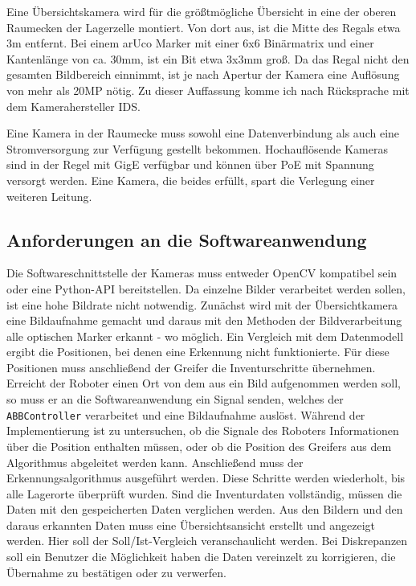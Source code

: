 Eine Übersichtskamera wird für die größtmögliche Übersicht in eine der oberen Raumecken der Lagerzelle montiert.
Von dort aus, ist die Mitte des Regals etwa 3m entfernt. 
Bei einem arUco Marker mit einer 6x6 Binärmatrix und einer Kantenlänge von ca. 30mm, ist ein Bit etwa 3x3mm groß.
Da das Regal nicht den gesamten Bildbereich einnimmt, ist je nach Apertur der Kamera eine Auflösung von mehr als 20MP nötig. 
Zu dieser Auffassung komme ich nach Rücksprache mit dem Kamerahersteller IDS. 

Eine Kamera in der Raumecke muss sowohl eine Datenverbindung als auch eine Stromversorgung zur Verfügung gestellt bekommen.
Hochauflösende Kameras sind in der Regel mit GigE verfügbar und können über PoE mit Spannung versorgt werden. 
Eine Kamera, die beides erfüllt, spart die Verlegung einer weiteren Leitung. 


\subsection{Anforderungen an die Softwareanwendung}

Die Softwareschnittstelle der Kameras muss entweder OpenCV kompatibel sein oder eine Python-API bereitstellen.
Da einzelne Bilder verarbeitet werden sollen, ist eine hohe Bildrate nicht notwendig.
Zunächst wird mit der Übersichtkamera eine Bildaufnahme gemacht und daraus mit den Methoden der Bildverarbeitung alle optischen Marker erkannt - wo möglich.
Ein Vergleich mit dem Datenmodell ergibt die Positionen, bei denen eine Erkennung nicht funktionierte.
Für diese Positionen muss anschließend der Greifer die Inventurschritte übernehmen.
Erreicht der Roboter einen Ort von dem aus ein Bild aufgenommen werden soll, so muss er an die Softwareanwendung ein Signal senden, welches
der \verb|ABBController| verarbeitet und eine Bildaufnahme auslöst.
Während der Implementierung ist zu untersuchen, ob die Signale des Roboters Informationen über die Position enthalten müssen, oder ob die Position des Greifers aus dem Algorithmus abgeleitet werden kann.
Anschließend muss der Erkennungsalgorithmus ausgeführt werden.
Diese Schritte werden wiederholt, bis alle Lagerorte überprüft wurden.  
Sind die Inventurdaten vollständig, müssen die Daten mit den gespeicherten Daten verglichen werden.
Aus den Bildern und den daraus erkannten Daten muss eine Übersichtsansicht erstellt und angezeigt werden. 
Hier soll der Soll/Ist-Vergleich veranschaulicht werden. 
Bei Diskrepanzen soll ein Benutzer die Möglichkeit haben die Daten vereinzelt zu korrigieren, die Übernahme zu bestätigen oder zu verwerfen.


